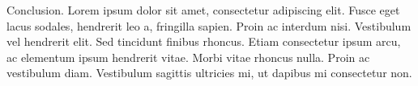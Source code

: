 Conclusion. Lorem ipsum dolor sit amet, consectetur adipiscing elit. Fusce eget lacus sodales, hendrerit leo a, fringilla sapien. Proin ac interdum nisi. Vestibulum vel hendrerit elit. Sed tincidunt finibus rhoncus. Etiam consectetur ipsum arcu, ac elementum ipsum hendrerit vitae. Morbi vitae rhoncus nulla. Proin ac vestibulum diam. Vestibulum sagittis ultricies mi, ut dapibus mi consectetur non.

\nocite{Po01}
